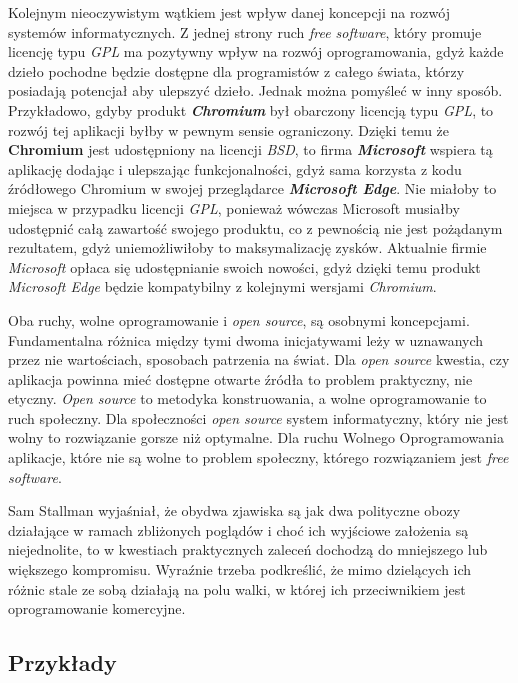 \documentclass{article}
\begin{document}
Kolejnym nieoczywistym wątkiem jest wpływ danej koncepcji na rozwój systemów informatycznych. Z jednej strony ruch \emph{free software}, który promuje licencję typu \emph{GPL} ma pozytywny wpływ na rozwój oprogramowania, gdyż każde dzieło pochodne będzie dostępne dla programistów z całego świata, którzy posiadają potencjał aby ulepszyć dzieło. Jednak można pomyśleć w inny sposób. Przykładowo, gdyby produkt \textbf{\emph{Chromium}} był obarczony licencją typu \emph{GPL}, to rozwój tej aplikacji byłby w pewnym sensie ograniczony. Dzięki temu że \textbf{Chromium} jest udostępniony na licencji \emph{BSD}, to firma \textbf{\emph{Microsoft}} wspiera tą aplikację dodając i ulepszając funkcjonalności, gdyż sama korzysta z kodu źródłowego Chromium w swojej przeglądarce \textbf{\emph{Microsoft Edge}}\cite{microsoft.edge}. Nie miałoby to miejsca w przypadku licencji \emph{GPL}, ponieważ wówczas Microsoft musiałby udostępnić całą zawartość swojego produktu, co z pewnością nie jest pożądanym rezultatem, gdyż uniemożliwiłoby to maksymalizację zysków. Aktualnie firmie \emph{Microsoft} opłaca się udostępnianie swoich nowości, gdyż dzięki temu produkt \emph{Microsoft Edge} będzie kompatybilny z kolejnymi wersjami \emph{Chromium}.

Oba ruchy, wolne oprogramowanie i \emph{open source}, są osobnymi koncepcjami. Fundamentalna różnica między tymi dwoma inicjatywami leży w uznawanych przez nie wartościach, sposobach patrzenia na świat. Dla \emph{open source} kwestia, czy aplikacja powinna mieć dostępne otwarte źródła to problem praktyczny, nie etyczny. \emph{Open source} to metodyka konstruowania, a wolne oprogramowanie to ruch społeczny. Dla społeczności \emph{open source} system informatyczny, który nie jest wolny to rozwiązanie gorsze niż optymalne. Dla ruchu Wolnego Oprogramowania aplikacje, które nie są wolne to problem społeczny, którego rozwiązaniem jest \emph{free software}\cite{Kotula}.

Sam Stallman wyjaśniał, że obydwa zjawiska są jak dwa polityczne obozy działające w ramach zbliżonych poglądów i choć ich wyjściowe założenia są niejednolite, to w kwestiach praktycznych zaleceń dochodzą do mniejszego lub większego kompromisu. Wyraźnie trzeba podkreślić, że mimo dzielących ich różnic stale ze sobą działają na polu walki, w której ich przeciwnikiem jest oprogramowanie komercyjne\cite{Kotula}.

\subsection{Przykłady}
\end{document}
